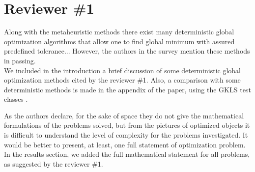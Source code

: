 
\section*{Reviewer \#1}


{\color{red} Along with the metaheuristic methods there exist many deterministic global optimization algorithms that allow one to find global minimum with assured predefined tolerance... However, the authors in the survey mention these methods in passing.
}\\

We included in the introduction a brief discussion of some deterministic global optimization methods cited by the reviewer \#1. Also, a comparison with some deterministic methods is made in the appendix of the paper, using the GKLS test classes \cite{GKLS}.


\vspace{1cm}

 
{\color{red} As the authors declare, for the sake of space they do not give the mathematical formulations of the problems solved, but from the pictures of optimized objects it is difficult to understand the level of complexity for the problems investigated. It would be better to present, at least, one full statement of optimization problem.
}\\

In the results section, we added the full mathematical statement for all problems, as suggested by the reviewer \#1.


\vspace{1cm}